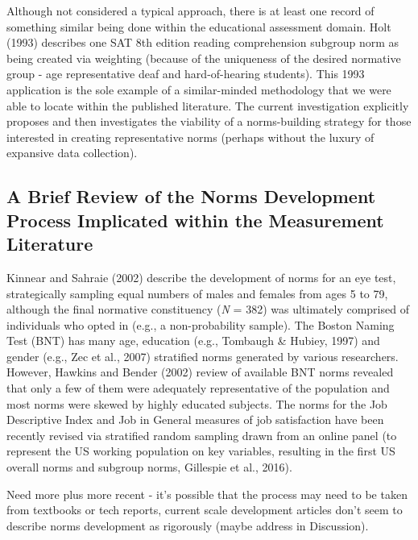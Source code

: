 \documentclass[
  ,man]{apa7}
\begin{document}
Although not considered a typical approach, there is at least one record of something similar being done within the educational assessment domain. Holt (1993) describes one SAT 8th edition reading comprehension subgroup norm as being created via weighting (because of the uniqueness of the desired normative group - age representative deaf and hard-of-hearing students). This 1993 application is the sole example of a similar-minded methodology that we were able to locate within the published literature. The current investigation explicitly proposes and then investigates the viability of a norms-building strategy for those interested in creating representative norms (perhaps without the luxury of expansive data collection).

\hypertarget{a-brief-review-of-the-norms-development-process-implicated-within-the-measurement-literature}{%
\subsection{A Brief Review of the Norms Development Process Implicated within the Measurement Literature}\label{a-brief-review-of-the-norms-development-process-implicated-within-the-measurement-literature}}

Kinnear and Sahraie (2002) describe the development of norms for an eye test, strategically sampling equal numbers of males and females from ages 5 to 79, although the final normative constituency (\emph{N} = 382) was ultimately comprised of individuals who opted in (e.g., a non-probability sample). The Boston Naming Test (BNT) has many age, education (e.g., Tombaugh \& Hubiey, 1997) and gender (e.g., Zec et al., 2007) stratified norms generated by various researchers. However, Hawkins and Bender (2002) review of available BNT norms revealed that only a few of them were adequately representative of the population and most norms were skewed by highly educated subjects. The norms for the Job Descriptive Index and Job in General measures of job satisfaction have been recently revised via stratified random sampling drawn from an online panel (to represent the US working population on key variables, resulting in the first US overall norms and subgroup norms, Gillespie et al., 2016).

Need more plus more recent - it's possible that the process may need to be taken from textbooks or tech reports, current scale development articles don't seem to describe norms development as rigorously (maybe address in Discussion).
\end{document}
